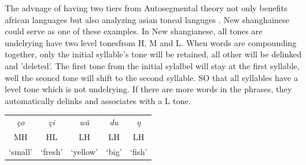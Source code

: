 The advnage of having two tiers from Autosegmental theory not only benefits
african languages but also analyzing asian toneal languges \citep{duanmuautosegmental1992}.
New shanghainese could serve as one of these examples. In New shangianese,
all tones are undelrying have two level tonesfrom H, M and L. When words
are compounding together, only the initial syllable's tone will be retained,
all other will be delinked and 'deleted'. The first tone from the initial sylalbel
will stay at the first syllable, well the seoncd tone will shift to the second syllable.
SO that all syllables have a level tone which is not undelrying. If there are more words in the
phrases, they automatically delinks and associates with a L tone.


\ex
\begin{tabular}{ccccc}
\textit{ço} & \textit{çi} & \textit{wã} & \textit{du} & \textit{ŋ} \\
MH          & HL          & LH          & LH          & LH          \\
`small'     & `fresh'     & `yellow'    & `big'       & `fish'      \\
\end{tabular}
\xe




